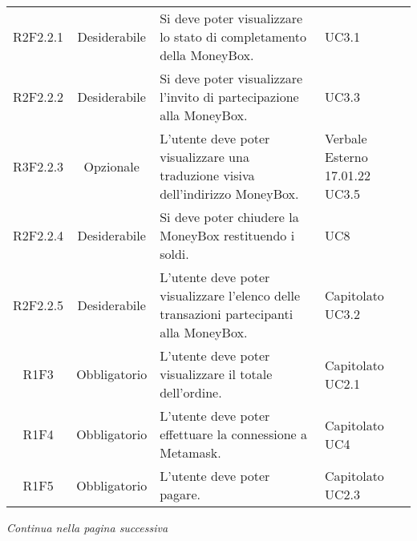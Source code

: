 \begin{table}[H]
\begin{tabular}{c | c | p{6cm} | p{4.1cm}}
        R2F2.2.1                                                          & Desiderabile & Si deve poter visualizzare lo stato di completamento della MoneyBox\glo{}.                    & UC3.1                                 \\
        R2F2.2.2                                                          & Desiderabile & Si deve poter visualizzare l'invito di partecipazione alla MoneyBox\glo{}.                    & UC3.3                                 \\
        R3F2.2.3                                                          & Opzionale    & L'utente deve poter visualizzare una traduzione visiva dell'indirizzo MoneyBox\glo{}.         & Verbale Esterno 17.01.22 UC3.5        \\
        R2F2.2.4                                                          & Desiderabile & Si deve poter chiudere la MoneyBox\glo{} restituendo i soldi.                                 & UC8                                   \\
        R2F2.2.5                                                          & Desiderabile & L'utente deve poter visualizzare l'elenco delle transazioni partecipanti alla MoneyBox\glo{}. & \Shortunderstack{Capitolato\\UC3.2\\} \\
        R1F3                                                              & Obbligatorio & L'utente deve poter visualizzare il totale dell'ordine.                                       & \Shortunderstack{Capitolato\\UC2.1\\} \\
        R1F4                                                              & Obbligatorio & L'utente deve poter effettuare la connessione a Metamask\glo{}.                               & \Shortunderstack{Capitolato\\UC4\\}   \\
        R1F5                                                              & Obbligatorio & L'utente deve poter pagare.                                                                   & \Shortunderstack{Capitolato\\UC2.3\\} \\
    \end{tabular}
\end{table}
\begin{center}
    \textit{\small Continua nella pagina successiva}
\end{center}
